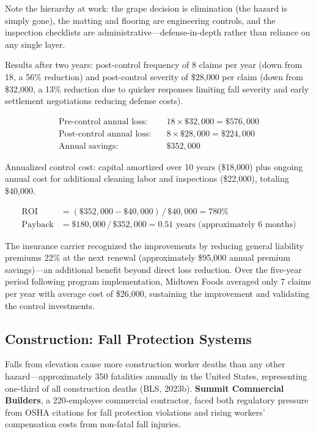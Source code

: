 \documentclass[11pt,openany]{book}
\begin{document}
Note the hierarchy at work: the grape decision is elimination (the hazard is
simply gone), the matting and flooring are engineering controls, and the
inspection checklists are administrative---defense-in-depth rather than
reliance on any single layer.

Results after two years: post-control frequency of 8 claims per year (down
from 18, a 56\% reduction) and post-control severity of \$28{,}000 per claim
(down from \$32{,}000, a 13\% reduction due to quicker responses limiting fall
severity and early settlement negotiations reducing defense costs).

\begin{align*}
\text{Pre-control annual loss:} \quad & 18 \times \$32{,}000 = \$576{,}000 \\
\text{Post-control annual loss:} \quad & 8 \times \$28{,}000 = \$224{,}000 \\
\text{Annual savings:} \quad & \$352{,}000
\end{align*}

Annualized control cost: capital amortized over 10 years (\$18{,}000) plus
ongoing annual cost for additional cleaning labor and inspections
(\$22{,}000), totaling \$40{,}000.

\begin{align*}
\text{ROI} &= (\$352{,}000 - \$40{,}000)\,/\,\$40{,}000 = 780\% \\
\text{Payback} &= \$180{,}000\,/\,\$352{,}000 = 0.51
  \text{ years (approximately 6 months)}
\end{align*}

The insurance carrier recognized the improvements by reducing general
liability premiums 22\% at the next renewal (approximately \$95{,}000 annual
premium savings)---an additional benefit beyond direct loss reduction. Over
the five-year period following program implementation, Midtown Foods averaged
only 7 claims per year with average cost of \$26{,}000, sustaining the
improvement and validating the control investments.

\subsection{Construction: Fall Protection Systems}
\label{subsec:summit}

Falls from elevation cause more construction worker deaths than any other
hazard---approximately 350 fatalities annually in the United States,
representing one-third of all construction deaths (BLS, 2023b).
\textbf{Summit Commercial Builders}, a 220-employee commercial contractor,
faced both regulatory pressure from OSHA citations for fall protection
violations and rising workers' compensation costs from non-fatal fall
injuries.
\end{document}
